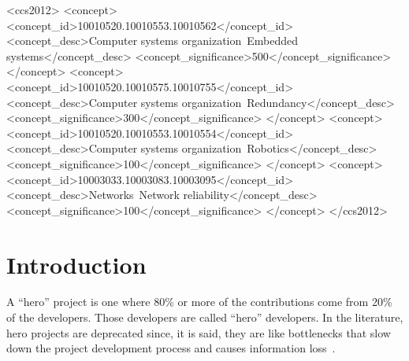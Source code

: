 \documentclass[sigconf,review]{acmart}
\begin{document}
\begin{CCSXML}
<ccs2012>
 <concept>
  <concept_id>10010520.10010553.10010562</concept_id>
  <concept_desc>Computer systems organization~Embedded systems</concept_desc>
  <concept_significance>500</concept_significance>
 </concept>
 <concept>
  <concept_id>10010520.10010575.10010755</concept_id>
  <concept_desc>Computer systems organization~Redundancy</concept_desc>
  <concept_significance>300</concept_significance>
 </concept>
 <concept>
  <concept_id>10010520.10010553.10010554</concept_id>
  <concept_desc>Computer systems organization~Robotics</concept_desc>
  <concept_significance>100</concept_significance>
 </concept>
 <concept>
  <concept_id>10003033.10003083.10003095</concept_id>
  <concept_desc>Networks~Network reliability</concept_desc>
  <concept_significance>100</concept_significance>
 </concept>
</ccs2012>
\end{CCSXML}




\maketitle

\section{Introduction}
A ``hero'' project is one where  80\% or more of the contributions come from 20\% of  the developers. Those developers are called ``hero'' developers. 
In the literature, hero projects are deprecated  since, it is said,
they are like bottlenecks that slow down the  project development process and causes information loss~\cite{bier2011online,boehm2006view,hislop2002integrating,morcovcomplex,wood2005multiview,fitzgerald2003making}. 
\end{document}
